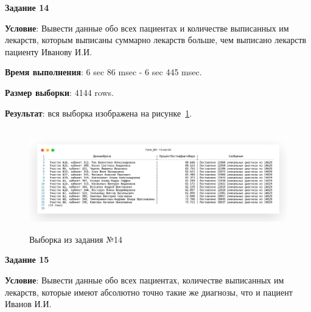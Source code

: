 
\newpage

\begin{center}
  \textbf{Задание 14}
\end{center}
  
\textbf{Условие}:
Вывести данные обо всех пациентах и количестве выписанных им лекарств, которым
выписаны суммарно лекарств больше, чем выписано лекарств пациенту Иванову И.И.



\textbf{Время выполнения}: 6 sec 86 msec - 6 sec 445 msec.

\textbf{Размер выборки}: 4144 rows.

\textbf{Результат}: вся выборка изображена на рисунке~\ref{fig:t14}.

\begin{figure}[!h]
  \centering

  \includegraphics[height=4.5cm]
  {../sql/task13/13-out.png}

  \caption{Выборка из задания №14}

  \label{fig:t14}
\end{figure}


\newpage

\begin{center}
  \textbf{Задание 15}
\end{center}
  
\textbf{Условие}:
Вывести данные обо всех пациентах, количестве выписанных им лекарств, которые имеют
абсолютно точно такие же диагнозы, что и пациент Иванов И.И.

% 

\newpage
